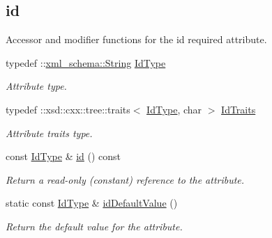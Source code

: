 \subsection*{id}
\label{_amgrpb80bb7740288fda1f201890375a60c8f}
Accessor and modifier functions for the id required attribute. \begin{DoxyCompactItemize}
\item 
\hypertarget{classopenstack_1_1xml_1_1Version_adc25fd51942519ad4a73a8b0618f3dd0}{
typedef ::\hyperlink{namespacexml__schema_af6757b5701ccc893f3b551bd70e0c94d}{xml\_\-schema::String} \hyperlink{classopenstack_1_1xml_1_1Version_adc25fd51942519ad4a73a8b0618f3dd0}{IdType}}
\label{classopenstack_1_1xml_1_1Version_adc25fd51942519ad4a73a8b0618f3dd0}

\begin{DoxyCompactList}\small\item\em Attribute type. \item\end{DoxyCompactList}\item 
\hypertarget{classopenstack_1_1xml_1_1Version_a1476608a117a4700b80216ae06d31a02}{
typedef ::xsd::cxx::tree::traits$<$ \hyperlink{classopenstack_1_1xml_1_1Version_adc25fd51942519ad4a73a8b0618f3dd0}{IdType}, char $>$ \hyperlink{classopenstack_1_1xml_1_1Version_a1476608a117a4700b80216ae06d31a02}{IdTraits}}
\label{classopenstack_1_1xml_1_1Version_a1476608a117a4700b80216ae06d31a02}

\begin{DoxyCompactList}\small\item\em Attribute traits type. \item\end{DoxyCompactList}\item 
const \hyperlink{classopenstack_1_1xml_1_1Version_adc25fd51942519ad4a73a8b0618f3dd0}{IdType} \& \hyperlink{classopenstack_1_1xml_1_1Version_a57fdf76f2136397417672583670357cd}{id} () const 
\begin{DoxyCompactList}\small\item\em Return a read-\/only (constant) reference to the attribute. \item\end{DoxyCompactList}\item 
static const \hyperlink{classopenstack_1_1xml_1_1Version_adc25fd51942519ad4a73a8b0618f3dd0}{IdType} \& \hyperlink{classopenstack_1_1xml_1_1Version_a67478bb041861faa06ba983e97a9ad10}{idDefaultValue} ()
\begin{DoxyCompactList}\small\item\em Return the default value for the attribute. \item\end{DoxyCompactList}\end{DoxyCompactItemize}
